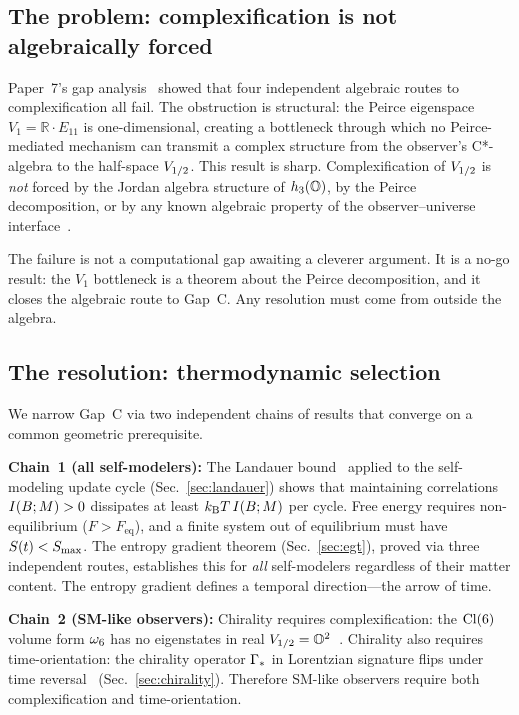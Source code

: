 \subsection{The problem: complexification is not algebraically forced}
\label{sec:intro-problem}

Paper~7's gap analysis~\cite{Paper7} showed that four independent
algebraic routes to complexification all fail.  The
obstruction is structural: the Peirce eigenspace
$V_1 = \mathbb{R} \cdot E_{11}$ is one-dimensional, creating a
bottleneck through which no Peirce-mediated mechanism can transmit a
complex structure from the observer's C*-algebra to the half-space
$V_{1/2}$.  This result is sharp.  Complexification of $V_{1/2}$ is
\emph{not} forced by the Jordan algebra structure of $h_3(\mathbb{O})$, by the
Peirce decomposition, or by any known algebraic property of the
observer--universe interface~\cite{BGW2020}.

The failure is not a computational gap awaiting a cleverer argument.
It is a no-go result: the $V_1$ bottleneck is a theorem about the
Peirce decomposition, and it closes the algebraic route to Gap~C.
Any resolution must come from outside the algebra.

\subsection{The resolution: thermodynamic selection}
\label{sec:intro-resolution}

We narrow Gap~C via two independent chains of results that
converge on a common geometric prerequisite.

\medskip\noindent
\textbf{Chain~1 (all self-modelers):}
The Landauer bound~\cite{Landauer1961,Bennett1982} applied to the
self-modeling update cycle (Sec.~\ref{sec:landauer}) shows that
maintaining correlations $I(B;M) > 0$ dissipates at least
$k_{\mathrm{B}} T\,I(B;M)$ per cycle.  Free energy requires
non-equilibrium ($F > F_{\mathrm{eq}}$), and a finite system out of
equilibrium must have $S(t) < S_{\max}$.  The entropy gradient theorem
(Sec.~\ref{sec:egt}), proved via three independent routes, establishes
this for \emph{all} self-modelers regardless of their matter content.
The entropy gradient defines a temporal direction---the arrow of time.

\medskip\noindent
\textbf{Chain~2 (SM-like observers):}
Chirality requires complexification: the $\mathrm{Cl}(6)$ volume form
$\omega_6$ has no eigenstates in real
$V_{1/2} = \mathbb{O}^2$~\cite{Paper7}.  Chirality also requires
time-orientation: the chirality operator $\Gamma_*$ in Lorentzian
signature flips under time reversal~\cite{LawsonMichelsohn1989}
(Sec.~\ref{sec:chirality}).  Therefore SM-like observers require
both complexification and time-orientation.

